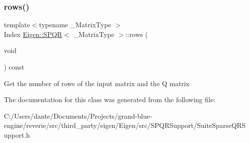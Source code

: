 \subsubsection{\texorpdfstring{rows()}{rows()}}
{\footnotesize\ttfamily template$<$typename \+\_\+\+Matrix\+Type $>$ \\
Index \mbox{\hyperlink{class_eigen_1_1_s_p_q_r}{Eigen\+::\+S\+P\+QR}}$<$ \+\_\+\+Matrix\+Type $>$\+::rows (\begin{DoxyParamCaption}\item[{void}]{ }\end{DoxyParamCaption}) const\hspace{0.3cm}{\ttfamily [inline]}}

Get the number of rows of the input matrix and the Q matrix 

The documentation for this class was generated from the following file\+:\begin{DoxyCompactItemize}
\item 
C\+:/\+Users/dante/\+Documents/\+Projects/grand-\/blue-\/engine/reverie/src/third\+\_\+party/eigen/\+Eigen/src/\+S\+P\+Q\+R\+Support/Suite\+Sparse\+Q\+R\+Support.\+h\end{DoxyCompactItemize}
